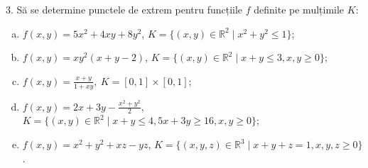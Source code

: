 \documentclass[11pt,a4paper]{article}
\newcommand\RR{\mathbb{R}}
\theoremstyle{dotless}
\theoremstyle{dotlessdr}
\begin{document}
\vspace{1cm}

3. Să se determine punctele de extrem pentru funcțiile $f$ definite pe mulțimile $K$:
\begin{enumerate}[(a)]
\item $f(x, y) = 5x^2 + 4xy + 8y^2$, $K = \{(x, y) \in \RR^2 \mid x^2 + y^2 \leq 1\}$;
\item $f(x, y) = xy^2(x + y - 2)$, $K = \{(x, y) \in \RR^2 \mid x + y \leq 3, x, y \geq 0\}$;
\item $f(x, y) = \frac{x + y}{1 + xy}, \ K = [0, 1] \times [0, 1]$;
\item $f(x, y) = 2x + 3y - \frac{x^2 + y^2}{2}$, $K = \{(x, y) \in \RR^2 \mid x + y \leq 4, %
  5x + 3y \geq 16, x, y \geq 0 \}$;
\item $f(x, y) = x^2 + y^2 + xz - yz$, $K = \{(x, y, z) \in \RR^3 \mid x + y + z = 1, %
  x, y, z \geq 0 \}$.
\end{enumerate}
\end{document}
